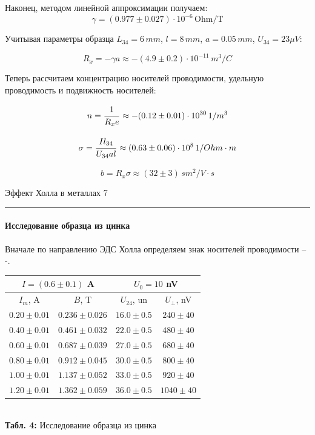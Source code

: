 \documentclass[12pt,a4paper]{scrartcl}
\begin{document}
	Наконец, методом линейной аппроксимации получаем:
	$$\gamma = (0.977 \pm 0.027) \cdot 10^{-6}\, \text{Ohm}/\text{T}$$
	
	Учитывая параметры образца $L_{34} = 6\, mm$, $l = 8\, mm$, $a = 0.05\, mm$, $U_{34} = 23 \mu V$:
	
	$$R_x = -\gamma a \approx -(4.9 \pm 0.2) \cdot 10^{-11}\, m^3/C$$
	
	Теперь рассчитаем концентрацию носителей проводимости, удельную проводимость и подвижность носителей:
	
	$$n = \dfrac{\strut 1}{\strut R_xe} \approx -(0.12 \pm 0.01) \cdot 10^{30}\, 1/m^3$$
	
	$$\sigma = \dfrac{\strut Il_{34}}{\strut U_{34}al} \approx (0.63 \pm 0.06) \cdot 10^8\, 1/Ohm \cdot m$$
	
	$$b = R_x\sigma \approx (32 \pm 3)\, sm^2/V\cdot s$$
	 
	\newpage
	
	
	\begin{flushleft}
		\footnotesize{Эффект Холла в металлах} \hspace{\fill} \footnotesize{7}
		\\[-0.3cm]\noindent\rule{\textwidth}{0.3pt}
	\end{flushleft}	
	
	\paragraph{Исследование образца из цинка} \hfill
	
	Вначале по направлению ЭДС Холла определяем знак носителей проводимости -- -.

	\begin{center}
		\begin{tabular}{|c|c|c|c|}
			\hline
			\multicolumn{2}{|c|}{$I = (0.6 \pm 0.1)$ A} & \multicolumn{2}{|c|}{$U_0 = 10$ nV}
			\\\hline
			$I_m$, A & $B$, T & $U_{24}$, un & $U_\perp$, nV
			\\\hline
			$0.20 \pm 0.01$ & $0.236 \pm 0.026$ & $16.0 \pm 0.5$ & $240 \pm 40$
			\\\hline
			$0.40 \pm 0.01$ & $0.461 \pm 0.032$ & $22.0 \pm 0.5$ & $480 \pm 40$
			\\\hline
			$0.60 \pm 0.01$ & $0.687 \pm 0.039$ & $27.0 \pm 0.5$ & $680 \pm 40$
			\\\hline
			$0.80 \pm 0.01$ & $0.912 \pm 0.045$ & $30.0 \pm 0.5$ & $800 \pm 40$
			\\\hline
			$1.00 \pm 0.01$ & $1.137 \pm 0.052$ & $33.0 \pm 0.5$ & $920 \pm 40$
			\\\hline
			$1.20 \pm 0.01$ & $1.362 \pm 0.059$ & $36.0 \pm 0.5$ & $1040 \pm 40$
			\\\hline
		\end{tabular}	
		\\\textbf{Табл. 4:} Исследование образца из цинка
	\end{center}	
	
\end{document}
